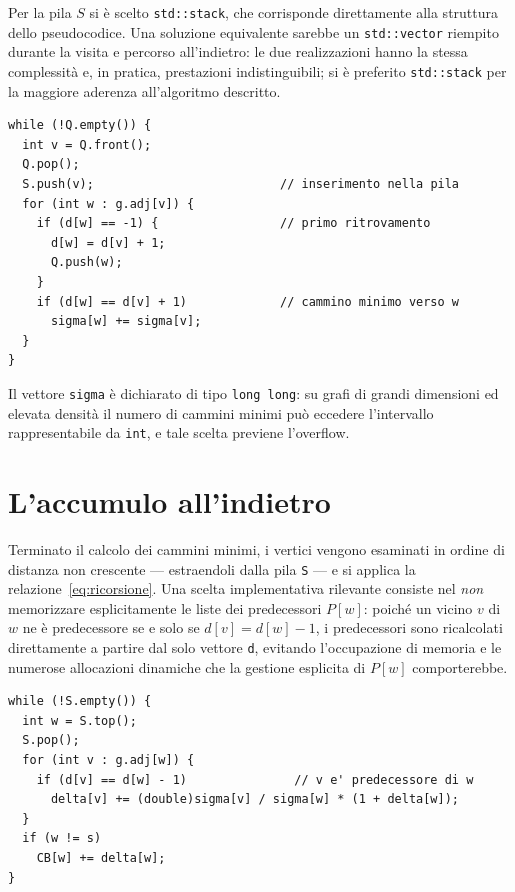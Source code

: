 \documentclass[11pt,a4paper]{report}
\begin{document}
Per la pila $S$ si è scelto \texttt{std::stack}, che corrisponde direttamente alla
struttura dello pseudocodice. Una soluzione equivalente sarebbe un \texttt{std::vector}
riempito durante la visita e percorso all'indietro: le due realizzazioni hanno la
stessa complessità e, in pratica, prestazioni indistinguibili; si è preferito
\texttt{std::stack} per la maggiore aderenza all'algoritmo descritto.

\begin{lstlisting}[caption={Calcolo dei cammini minimi con il relativo conteggio (BFS).}]
while (!Q.empty()) {
  int v = Q.front();
  Q.pop();
  S.push(v);                          // inserimento nella pila
  for (int w : g.adj[v]) {
    if (d[w] == -1) {                 // primo ritrovamento
      d[w] = d[v] + 1;
      Q.push(w);
    }
    if (d[w] == d[v] + 1)             // cammino minimo verso w
      sigma[w] += sigma[v];
  }
}
\end{lstlisting}

Il vettore \texttt{sigma} è dichiarato di tipo \texttt{long long}: su grafi di
grandi dimensioni ed elevata densità il numero di cammini minimi può eccedere
l'intervallo rappresentabile da \texttt{int}, e tale scelta previene l'overflow.

\section{L'accumulo all'indietro}

Terminato il calcolo dei cammini minimi, i vertici vengono esaminati in ordine di
distanza non crescente --- estraendoli dalla pila \texttt{S} --- e
si applica la relazione~\eqref{eq:ricorsione}. Una scelta implementativa
rilevante consiste nel \emph{non} memorizzare esplicitamente le liste dei
predecessori $P[w]$: poiché un vicino $v$ di $w$ ne è predecessore se e solo se
$d[v]=d[w]-1$, i predecessori sono ricalcolati direttamente a partire dal solo
vettore \texttt{d}, evitando l'occupazione di memoria e le numerose
allocazioni dinamiche che la gestione esplicita di $P[w]$ comporterebbe.

\begin{lstlisting}[caption={Accumulo delle dipendenze (predecessori ricalcolati).}]
while (!S.empty()) {
  int w = S.top();
  S.pop();
  for (int v : g.adj[w]) {
    if (d[v] == d[w] - 1)               // v e' predecessore di w
      delta[v] += (double)sigma[v] / sigma[w] * (1 + delta[w]);
  }
  if (w != s)
    CB[w] += delta[w];
}
\end{lstlisting}
\end{document}
